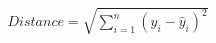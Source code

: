\documentclass[preview]{standalone}
\begin{document}
\begin{align*}
Distance = \sqrt{\sum_{i=1}^{n} (y_i - \hat{y}_i)^2}
\end{align*}
\end{document}
